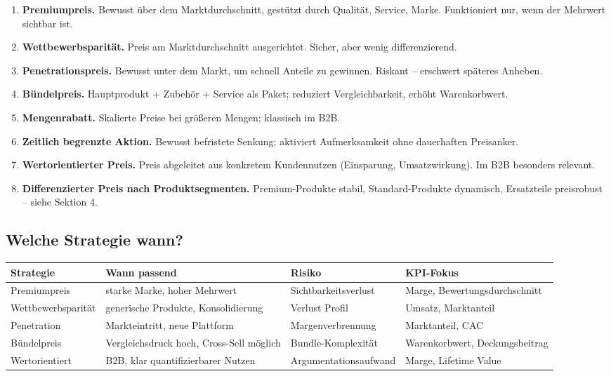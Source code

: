 \documentclass[11pt,a4paper,oneside]{article}
\newcommand{\fachbegriff}[1]{\textbf{#1}}
\begin{document}
\begin{enumerate}
  \item \fachbegriff{Premiumpreis.} Bewusst über dem Marktdurchschnitt, gestützt durch Qualität, Service, Marke. Funktioniert nur, wenn der Mehrwert sichtbar ist.
  \item \fachbegriff{Wettbewerbsparität.} Preis am Marktdurchschnitt ausgerichtet. Sicher, aber wenig differenzierend.
  \item \fachbegriff{Penetrationspreis.} Bewusst unter dem Markt, um schnell Anteile zu gewinnen. Riskant -- erschwert späteres Anheben.
  \item \fachbegriff{Bündelpreis.} Hauptprodukt + Zubehör + Service als Paket; reduziert Vergleichbarkeit, erhöht Warenkorbwert.
  \item \fachbegriff{Mengenrabatt.} Skalierte Preise bei größeren Mengen; klassisch im B2B.
  \item \fachbegriff{Zeitlich begrenzte Aktion.} Bewusst befristete Senkung; aktiviert Aufmerksamkeit ohne dauerhaften Preisanker.
  \item \fachbegriff{Wertorientierter Preis.} Preis abgeleitet aus konkretem Kundennutzen (Einsparung, Umsatzwirkung). Im B2B besonders relevant.
  \item \fachbegriff{Differenzierter Preis nach Produktsegmenten.} Premium-Produkte stabil, Standard-Produkte dynamisch, Ersatzteile preisrobust -- siehe Sektion 4.
\end{enumerate}

\subsection{Welche Strategie wann?}

\begin{tabularx}{\linewidth}{@{}lXXX@{}}
\toprule
\textbf{Strategie} & \textbf{Wann passend} & \textbf{Risiko} & \textbf{KPI-Fokus} \\
\midrule
Premiumpreis & starke Marke, hoher Mehrwert & Sichtbarkeitsverlust & Marge, Bewertungsdurchschnitt \\
Wettbewerbsparität & generische Produkte, Konsolidierung & Verlust Profil & Umsatz, Marktanteil \\
Penetration & Markteintritt, neue Plattform & Margenverbrennung & Marktanteil, CAC \\
Bündelpreis & Vergleichsdruck hoch, Cross-Sell möglich & Bundle-Komplexität & Warenkorbwert, Deckungsbeitrag \\
Wertorientiert & B2B, klar quantifizierbarer Nutzen & Argumentationsaufwand & Marge, Lifetime Value \\
\bottomrule
\end{tabularx}
\end{document}
